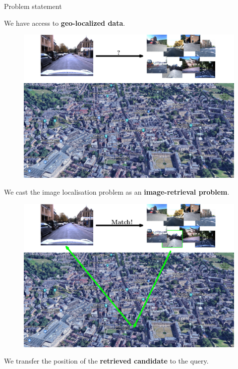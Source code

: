 \begin{frame}{Problem statement}
{\begin{minipage}{0.75\linewidth}
\begin{figure}
		\end{figure}		
	\end{minipage}
	\hfill
	\begin{minipage}{0.18\linewidth}
			We have access to \textbf{geo-localized data}.
	\end{minipage}
	}
	{
	\begin{minipage}{0.75\linewidth}
		\begin{figure}
			\includegraphics[width=\linewidth]{vect/intro/fig1/gif/3}
		\end{figure}		
	\end{minipage}
	\hfill
	\begin{minipage}{0.18\linewidth}
		We cast the image localisation problem as an \textbf{image-retrieval problem}.
	\end{minipage}
	}
	{
	\begin{minipage}{0.75\linewidth}
		\begin{figure}
			\includegraphics[width=\linewidth]{vect/intro/fig1/gif/6}
		\end{figure}		
	\end{minipage}
	\hfill
	\begin{minipage}{0.18\linewidth}
		We transfer the position of the \textbf{retrieved candidate} to the query.
	\end{minipage}
	}
\end{frame}


